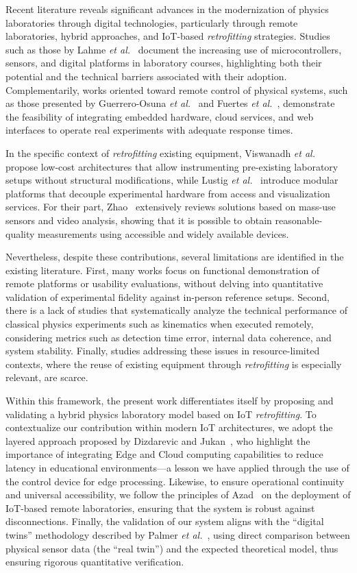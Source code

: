 \documentclass[sensors,article,submit,pdftex]{Definitions/mdpi}
\begin{document}
Recent literature reveals significant advances in the modernization of physics laboratories through digital technologies, particularly through remote laboratories, hybrid approaches, and IoT-based \textit{retrofitting} strategies. Studies such as those by Lahme \textit{et al.}~\cite{r1} document the increasing use of microcontrollers, sensors, and digital platforms in laboratory courses, highlighting both their potential and the technical barriers associated with their adoption. Complementarily, works oriented toward remote control of physical systems, such as those presented by Guerrero-Osuna \textit{et al.}~\cite{r4} and Fuertes \textit{et al.}~\cite{r3}, demonstrate the feasibility of integrating embedded hardware, cloud services, and web interfaces to operate real experiments with adequate response times.

In the specific context of \textit{retrofitting} existing equipment, Viswanadh \textit{et al.}~\cite{r2} propose low-cost architectures that allow instrumenting pre-existing laboratory setups without structural modifications, while Lustig \textit{et al.}~\cite{r5} introduce modular platforms that decouple experimental hardware from access and visualization services. For their part, Zhao~\cite{r6} extensively reviews solutions based on mass-use sensors and video analysis, showing that it is possible to obtain reasonable-quality measurements using accessible and widely available devices.

Nevertheless, despite these contributions, several limitations are identified in the existing literature. First, many works focus on functional demonstration of remote platforms or usability evaluations, without delving into quantitative validation of experimental fidelity against in-person reference setups. Second, there is a lack of studies that systematically analyze the technical performance of classical physics experiments such as kinematics when executed remotely, considering metrics such as detection time error, internal data coherence, and system stability. Finally, studies addressing these issues in resource-limited contexts, where the reuse of existing equipment through \textit{retrofitting} is especially relevant, are scarce.

Within this framework, the present work differentiates itself by proposing and validating a hybrid physics laboratory model based on IoT \textit{retrofitting}. To contextualize our contribution within modern IoT architectures, we adopt the layered approach proposed by Dizdarevic and Jukan~\cite{r7}, who highlight the importance of integrating Edge and Cloud computing capabilities to reduce latency in educational environments---a lesson we have applied through the use of the control device for edge processing. Likewise, to ensure operational continuity and universal accessibility, we follow the principles of Azad~\cite{r8} on the deployment of IoT-based remote laboratories, ensuring that the system is robust against disconnections. Finally, the validation of our system aligns with the ``digital twins'' methodology described by Palmer \textit{et al.}~\cite{r9}, using direct comparison between physical sensor data (the ``real twin'') and the expected theoretical model, thus ensuring rigorous quantitative verification.
\end{document}
